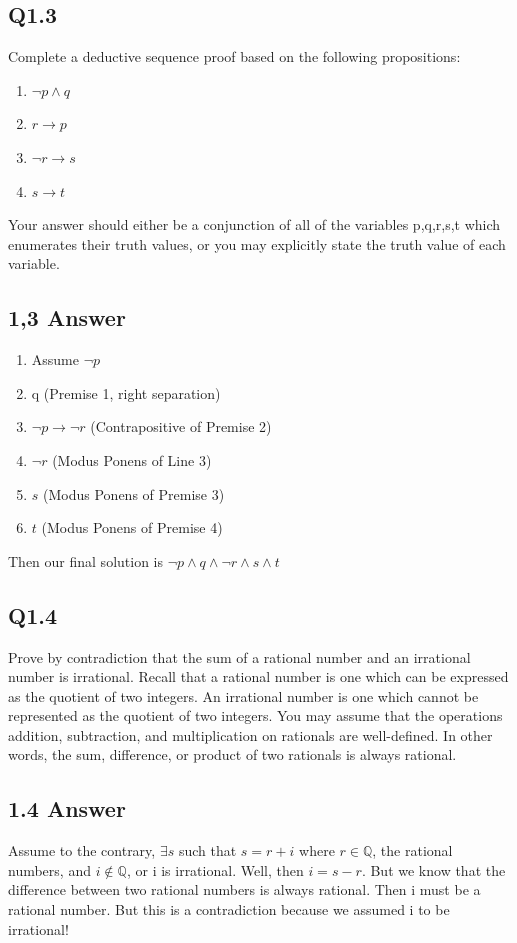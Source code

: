 \documentclass{article}
\begin{document}
\subsection*{Q1.3}
Complete a deductive sequence proof based on the following propositions:
\begin{enumerate}
    \item $\lnot p \land q$
    \item $r \rightarrow p$
    \item $\lnot r \rightarrow s$
    \item $s \rightarrow t$
\end{enumerate}
Your answer should either be a conjunction of all of the variables p,q,r,s,t which enumerates their
truth values, or you may explicitly state the truth value of each variable.
\newpage
\subsection*{1,3 Answer}
\begin{enumerate}
    \item Assume $\lnot p$
    \item q (Premise 1, right separation)
    \item $\lnot p \rightarrow \lnot r$ (Contrapositive of Premise 2)
    \item $\lnot r$ (Modus Ponens of Line 3)
    \item $s$ (Modus Ponens of Premise 3)
    \item $t$ (Modus Ponens of Premise 4)
\end{enumerate}
Then our final solution is $\lnot p \land q \land \lnot r \land s \land t$
\newpage
\subsection*{Q1.4}
Prove by contradiction that the sum of a rational number and an irrational number is irrational. Recall that a rational number is one
which can be expressed as the quotient of two integers. An irrational number is one which cannot be represented as the quotient of two integers.
You may assume that the operations addition, subtraction, and multiplication on rationals are well-defined. In other words, the sum, difference, or
product of two rationals is always rational.
\newpage
\subsection*{1.4 Answer}
Assume to the contrary, $\exists s$ such that $s = r + i$ where $r \in \mathbb{Q}$, the rational numbers, and $i \notin \mathbb{Q}$, or i is irrational.
Well, then $i = s - r$. But we know that the difference between two rational numbers is always rational. Then i must be a rational number. But this is a contradiction
because we assumed i to be irrational! 
\newpage
\end{document}
